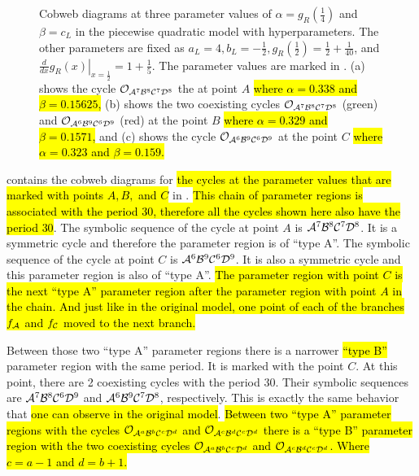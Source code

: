 \begin{figure}
	\centering
	\caption[Cobwebs of the piecewise quadratic model with hyperparameters for different values of the fixed parameters]{
	Cobweb diagrams at three parameter values of $\alpha = g_R\left(\frac{1}{4}\right)$ and $\beta = c_L$ in the piecewise quadratic model with hyperparameters.
	The other parameters are fixed as $a_L = 4, b_L = -\frac{1}{2}, g_R\left(\frac{1}{2}\right) = \frac{1}{2} + \frac{1}{40}$, and $\left. \frac{d}{dx} g_R(x) \right|_{x = \frac{1}{2}} = 1 + \frac{1}{5}$.
	The parameter values are marked in .
	(a) shows the cycle $\mathcal{O}_{\mathcal{A}^7\mathcal{B}^8\mathcal{C}^7\mathcal{D}^8}$ the at point $A$ \hl{where $\alpha = 0.338$ and $\beta = 0.15625$,}
	(b) shows the two coexisting cycles $\mathcal{O}_{\mathcal{A}^7\mathcal{B}^8\mathcal{C}^7\mathcal{D}^8}$ (green) and $\mathcal{O}_{\mathcal{A}^6\mathcal{B}^9\mathcal{C}^6\mathcal{D}^9}$ (red) at the point $B$ \hl{where $\alpha = 0.329$ and $\beta = 0.1571$,}
	and (c) shows the cycle $\mathcal{O}_{\mathcal{A}^6\mathcal{B}^9\mathcal{C}^6\mathcal{D}^9}$ at the point $C$ \hl{where $\alpha = 0.323$ and $\beta = 0.159$.}
	}
	\label{fig:setup.quad.hyper.2.cobwebs}
\end{figure}

 contains the cobweb diagrams for \hl{the cycles at the parameter values that are marked with points $A, B,$ and $C$} in .
\hl{This chain of parameter regions is associated with the period $30$, therefore all the cycles shown here also have the period $30$}.
The symbolic sequence of the cycle at point $A$ is $\mathcal{A}^7\mathcal{B}^8\mathcal{C}^7\mathcal{D}^8$.
It is a symmetric cycle and therefore the parameter region is of ``type A''.
The symbolic sequence of the cycle at point $C$ is $\mathcal{A}^6\mathcal{B}^9\mathcal{C}^6\mathcal{D}^9$.
It is also a symmetric cycle and this parameter region is also of ``type A''.
\hl{
	The parameter region with point $C$ is the next ``type A'' parameter region after the parameter region with point $A$ in the chain.
	And just like in the original model, one point of each of the branches $f_{\mathcal{A}}$ and $f_{\mathcal{C}}$ moved to the next branch.
}

Between those two ``type A'' parameter regions there is a narrower \hl{``type B''} parameter region with the same period.
It is marked with the point $C$.
At this point, there are 2 coexisting cycles with the period 30.
Their symbolic sequences are $\mathcal{A}^7\mathcal{B}^8\mathcal{C}^6\mathcal{D}^9$ and $\mathcal{A}^6\mathcal{B}^9\mathcal{C}^7\mathcal{D}^8$, respectively.
This is exactly the same behavior that \hl{one can observe in the original model}.
\hl{
	Between two ``type A'' parameter regions with the cycles $\mathcal{O}_{\mathcal{A}^a\mathcal{B}^b\mathcal{C}^c\mathcal{D}^d}$ and $\mathcal{O}_{\mathcal{A}^c\mathcal{B}^d\mathcal{C}^c\mathcal{D}^d}$ there is a ``type B'' parameter region with the two coexisting cycles $\mathcal{O}_{\mathcal{A}^a\mathcal{B}^b\mathcal{C}^c\mathcal{D}^d}$ and $\mathcal{O}_{\mathcal{A}^c\mathcal{B}^d\mathcal{C}^c\mathcal{D}^d}$.
	Where $c = a - 1$ and $d = b + 1$.
}

